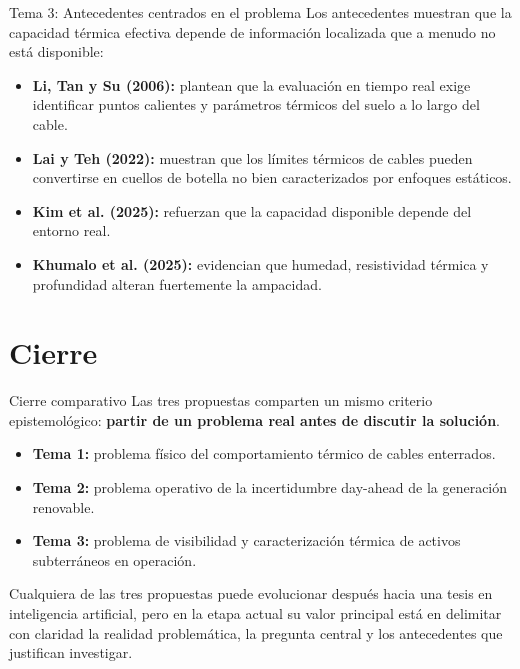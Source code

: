 \documentclass[aspectratio=169]{beamer}
\begin{document}
\begin{frame}{Tema 3: Antecedentes centrados en el problema}
\justifying
Los antecedentes muestran que la capacidad térmica efectiva depende de información localizada que a menudo no está disponible:
\begin{itemize}[leftmargin=*]
    \item \textbf{Li, Tan y Su (2006):} plantean que la evaluación en tiempo real exige identificar puntos calientes y parámetros térmicos del suelo a lo largo del cable.
    \item \textbf{Lai y Teh (2022):} muestran que los límites térmicos de cables pueden convertirse en cuellos de botella no bien caracterizados por enfoques estáticos.
    \item \textbf{Kim et al. (2025):} refuerzan que la capacidad disponible depende del entorno real.
    \item \textbf{Khumalo et al. (2025):} evidencian que humedad, resistividad térmica y profundidad alteran fuertemente la ampacidad.
\end{itemize}
\end{frame}

\section{Cierre}

\begin{frame}{Cierre comparativo}
\justifying
Las tres propuestas comparten un mismo criterio epistemológico: \textbf{partir de un problema real antes de discutir la solución}.

\vspace{0.5em}
\begin{itemize}[leftmargin=*]
    \item \textbf{Tema 1:} problema físico del comportamiento térmico de cables enterrados.
    \item \textbf{Tema 2:} problema operativo de la incertidumbre day-ahead de la generación renovable.
    \item \textbf{Tema 3:} problema de visibilidad y caracterización térmica de activos subterráneos en operación.
\end{itemize}

\vspace{0.5em}
Cualquiera de las tres propuestas puede evolucionar después hacia una tesis en inteligencia artificial, pero en la etapa actual su valor principal está en delimitar con claridad la realidad problemática, la pregunta central y los antecedentes que justifican investigar.
\end{frame}
\end{document}
